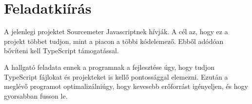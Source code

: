 \chapter*{Feladatkiírás}

\noindent

A jelenlegi projektet Sourcemeter Javascriptnek hívják.
A cél az, hogy ez a projekt többet tudjon, mint a piacon a többi kódelemező.
Ebből adódóan bővíteni kell TypeScript támogatással.

\noindent

A hallgató feladata ennek a programnak a fejlesztése úgy, hogy tudjon TypeScript fájlokat és projekteket is kellő pontossággal elemezni. 
Ezután a meglévő programot optimalizálniúgy, hogy kevesebb erőforrást igényeljen, és hogy gyorsabban fusson le.
